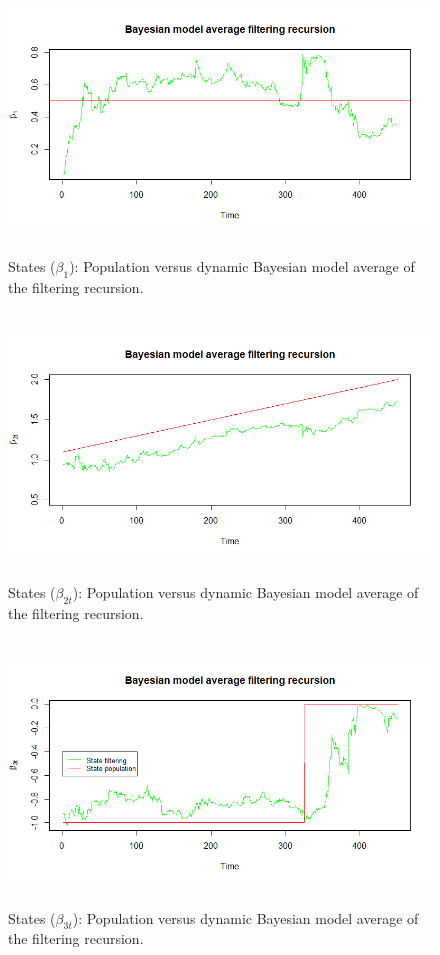 \begin{figure}[!h]
	\includegraphics[width=340pt, height=200pt]{Chapters/chapter8/figures/figPMPdbma1.png}
	\caption[List of figure caption goes here]{States ($\beta_{1}$): Population versus dynamic Bayesian model average of the filtering recursion.}\label{figPMPdbma1}
\end{figure}

\begin{figure}[!h]
	\includegraphics[width=340pt, height=200pt]{Chapters/chapter8/figures/figPMPdbma2.png}
	\caption[List of figure caption goes here]{States ($\beta_{2t}$): Population versus dynamic Bayesian model average of the filtering recursion.}\label{figPMPdbma2}
\end{figure}

\begin{figure}[!h]
	\includegraphics[width=340pt, height=200pt]{Chapters/chapter8/figures/figPMPdbma3.png}
	\caption[List of figure caption goes here]{States ($\beta_{3t}$): Population versus dynamic Bayesian model average of the filtering recursion.}\label{figPMPdbma3}
\end{figure}


